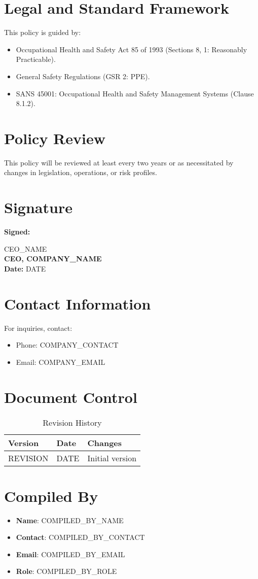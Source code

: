 \documentclass[12pt]{article}
\begin{document}
\section{Legal and Standard Framework}
This policy is guided by:
\begin{itemize}
    \item Occupational Health and Safety Act 85 of 1993 (Sections 8, 1: Reasonably Practicable).
    \item General Safety Regulations (GSR 2: PPE).
    \item SANS 45001: Occupational Health and Safety Management Systems (Clause 8.1.2).
\end{itemize}

\section{Policy Review}
This policy will be reviewed at least every two years or as necessitated by changes in legislation, operations, or risk profiles.

\section{Signature}
\textbf{Signed:}

{{CEO_NAME}}\\
\textbf{CEO, {{COMPANY_NAME}}}\\
\textbf{Date:} {{DATE}}

\section{Contact Information}
For inquiries, contact:
\begin{itemize}
    \item Phone: {{COMPANY_CONTACT}}
    \item Email: {{COMPANY_EMAIL}}
\end{itemize}

\section{Document Control}
\begin{table}[h]
    \centering
    \begin{tabular}{p{3cm}p{3cm}p{6cm}}
        \toprule
        \textbf{Version} & \textbf{Date} & \textbf{Changes} \\
        \midrule
        {{REVISION}} & {{DATE}} & Initial version \\
        \bottomrule
    \end{tabular}
    \caption{Revision History}
\end{table}

\section{Compiled By}
\begin{itemize}
    \item \textbf{Name}: {{COMPILED_BY_NAME}}
    \item \textbf{Contact}: {{COMPILED_BY_CONTACT}}
    \item \textbf{Email}: {{COMPILED_BY_EMAIL}}
    \item \textbf{Role}: {{COMPILED_BY_ROLE}}
\end{itemize}
\end{document}
